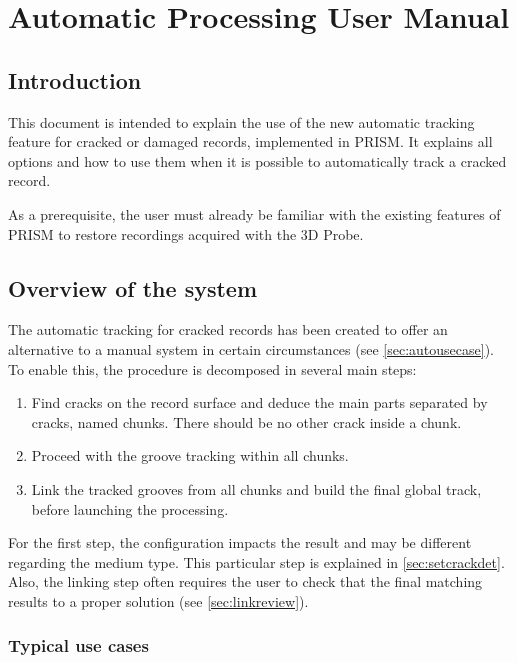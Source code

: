 
\chapter{Automatic Processing User Manual}
\label{chap:usermanauto}

\section{Introduction}

This document is intended to explain the use of the new automatic tracking feature for cracked or damaged records, implemented in PRISM. It explains all options and how to use them when it is possible to automatically track a cracked record.

As a prerequisite, the user must already be familiar with the existing features of PRISM to restore recordings acquired with the 3D Probe.

\section{Overview of the system}

The automatic tracking for cracked records has been created to offer an alternative to a manual system in certain circumstances (see \autoref{sec:autousecase}). To enable this, the procedure is decomposed in several main steps:

\begin{enumerate}
\item Find cracks on the record surface and deduce the main parts separated by cracks, named chunks. There should be no other crack inside a chunk.
\item Proceed with the groove tracking within all chunks.
\item Link the tracked grooves from all chunks and build the final global track, before launching the processing.
\end{enumerate}

For the first step, the configuration impacts the result and may be different regarding the medium type. This particular step is explained in \autoref{sec:setcrackdet}. Also, the linking step often requires the user to check that the final matching results to a proper solution (see \autoref{sec:linkreview}).

\subsection{Typical use cases}
\label{sec:autousecase}

